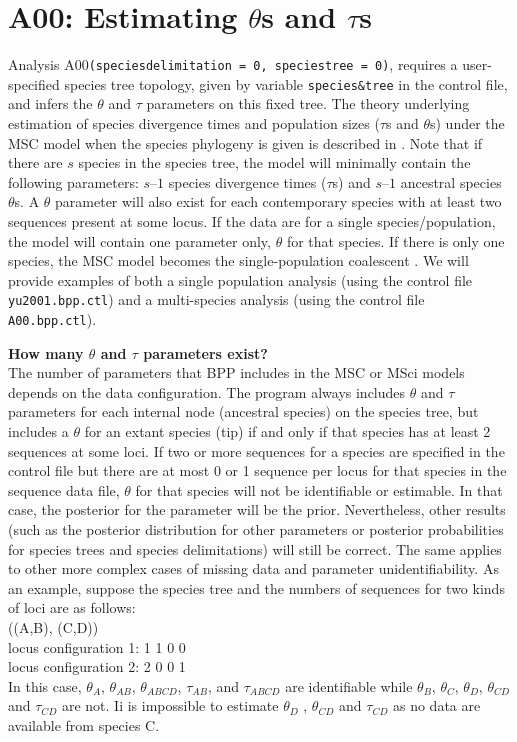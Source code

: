 \documentclass{book}
\numberwithin{equation}{section} \renewcommand{\baselinestretch}{0.55}
\begin{document}
 \section{A00: Estimating $\theta$s and $\tau$s} \label{a00} Analysis
 A00\texttt{(speciesdelimitation = 0, speciestree = 0)}, requires a
 user-specified species tree topology, given by variable
 \texttt{species\&tree} in the control file, and infers the $\theta$
 and $\tau$ parameters on this fixed tree.  The theory underlying
 estimation of species divergence times and population sizes ($\tau$s
 and $\theta$s) under the MSC model when the species phylogeny is
 given is described in \citep{Rannala2003}.  Note that if there are
 $s$ species in the species tree, the model will minimally contain the
 following parameters: $s – 1$ species divergence times ($\tau$s) and
 $s – 1$ ancestral species $\theta$s.  A $\theta$ parameter will also
 exist for each contemporary species with at least two sequences
 present at some locus. If the data are for a single
 species/population, the model will contain one parameter only,
 $\theta$ for that species. If there is only one species, the MSC
 model becomes the single-population coalescent
 \citep{Kingman1982}. We will provide examples of both a single
 population analysis (using the control file \texttt{yu2001.bpp.ctl})
 and a multi-species analysis (using the control file
 \texttt{A00.bpp.ctl}).


\begin{mdframed}
  \textbf{How many $\theta$ and $\tau$ parameters exist?} \\
  The number of parameters that \textsc{BPP} includes in the MSC or
  MSci models depends on the data configuration. The program always
  includes $\theta$ and $\tau$ parameters for each internal node
  (ancestral species) on the species tree, but includes a $\theta$ for
  an extant species (tip) if and only if that species has at least 2
  sequences at some loci.  If two or more sequences for a species are
  specified in the control file but there are at most 0 or 1 sequence
  per locus for that species in the sequence data file, $\theta$ for
  that species will not be identifiable or estimable.  In that case,
  the posterior for the parameter will be the prior.  Nevertheless,
  other results (such as the posterior distribution for other
  parameters or posterior probabilities for species trees and species
  delimitations) will still be correct.  The same applies to other
  more complex cases of missing data and parameter unidentifiability.
  As an example, suppose the species tree and the numbers of sequences
  for two kinds of loci are as follows: \\
  ((A,B), (C,D)) \\
  locus configuration 1:  1 1 0 0 \\
  locus configuration 2:  2 0 0 1 \\
  In this case, $\theta_A$, $\theta_{AB}$, $\theta_{ABCD}$,
  $\tau_{AB}$, and $\tau_{ABCD}$ are identifiable while $\theta_B$,
  $\theta_C$, $\theta_D$, $\theta_{CD}$ and $\tau_{CD}$ are not.  Ii
  is impossible to estimate $\theta_D$ , $\theta_{CD}$ and $\tau_{CD}$
  as no data are available from species C.
\end{mdframed}
\end{document}
